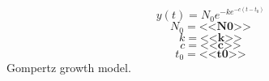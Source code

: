 \documentclass[border=0pt,varwidth,fleqn]{standalone}
\begin{document}
 
\huge
\[
    y(t) = N_0 e^{-k e^{-c (t - t_0)}}
\]
\large
\[
    N_0 = \textbf{<<N0>>}
\]
\[
    k = \textbf{<<k>>}
\]
\[
    c = \textbf{<<c>>}
\]
\[
    t_0 = \textbf{<<t0>>}
\]
Gompertz growth model.
\end{document}
